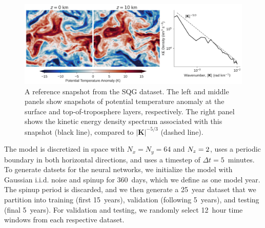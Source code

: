 \begin{figure}
    \centering
    \includegraphics[width=\textwidth]{../figures/sqg_reference_plot.jpg}
    \caption{A reference snapshot from the SQG dataset. The left and middle panels
        show snapshots of potential temperature anomaly at the surface and
        top-of-troposphere layers, respectively.
        The right panel shows the kinetic energy density spectrum associated
        with this snapshot (black line), compared to
        $|\mathbf{K}|^{-5/3}$ (dashed line).
    }
    \label{fig:sqg-reference}
\end{figure}

The model is discretized in space with $N_x = N_y = 64$ and $N_{z}=2$,
uses a periodic boundary in both horizontal directions,
and uses a timestep of $\Delta t=5$~minutes.
To generate datsets for the neural networks, we initialize the model with Gaussian i.i.d.
noise and spinup for 360~days, which we define as one model year.
The spinup period is discarded, and we then generate a 25~year dataset that we partition
into training (first 15~years), validation (following 5~years), and testing
(final 5~years).
For validation and testing, we randomly select 12~hour time windows from each
respective dataset.
